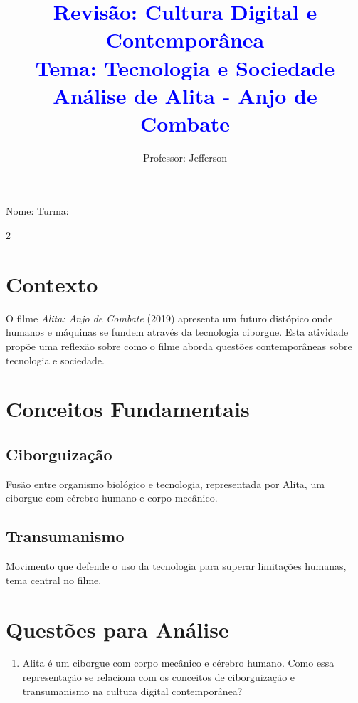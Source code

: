 \documentclass[11pt]{article}
\title{\textcolor{blue}{Revisão: Cultura Digital e Contemporânea \\ Tema: Tecnologia e Sociedade \\ Análise de Alita - Anjo de Combate}}
\author{Professor: Jefferson}
\date{}
\begin{document}
\maketitle
\vspace{-1cm}

\begin{center}
\large{Nome: \underline{\hspace{8cm}} \quad Turma: \underline{\hspace{3cm}}}
\end{center}

\begin{multicols}{2}

\section*{Contexto}
O filme \textit{Alita: Anjo de Combate} (2019) apresenta um futuro distópico onde humanos e máquinas se fundem através da tecnologia ciborgue. Esta atividade propõe uma reflexão sobre como o filme aborda questões contemporâneas sobre tecnologia e sociedade.

\section*{Conceitos Fundamentais}

\subsection*{Ciborguização}
Fusão entre organismo biológico e tecnologia, representada por Alita, um ciborgue com cérebro humano e corpo mecânico.

\subsection*{Transumanismo}
Movimento que defende o uso da tecnologia para superar limitações humanas, tema central no filme.

\section*{Questões para Análise}

\begin{enumerate}[leftmargin=*, label=\arabic*., series=questoes]

\item Alita é um ciborgue com corpo mecânico e cérebro humano. Como essa representação se relaciona com os conceitos de ciborguização e transumanismo na cultura digital contemporânea?


\end{enumerate}
\end{multicols}
\end{document}
